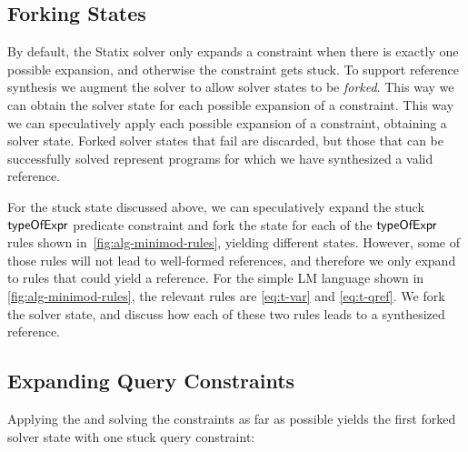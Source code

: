 \subsection{Forking States}
By default, the Statix solver only expands a constraint when there is exactly one possible expansion, and otherwise the constraint gets stuck.
To support reference synthesis we augment the solver to allow solver states to be \emph{forked}.
This way we can obtain the solver state for each possible expansion of a constraint.
This way we can speculatively apply each possible expansion of a constraint, obtaining a solver state.
Forked solver states that fail are discarded, but those that can be successfully solved represent programs for which we have synthesized a valid reference.

For the stuck state discussed above, we can speculatively expand the stuck $\mathsf{typeOfExpr}$ predicate constraint and fork the state for each of the $\mathsf{typeOfExpr}$ rules shown in~\cref{fig:alg-minimod-rules}, yielding different states.
However, some of those rules will not lead to well-formed references, and therefore we only expand to rules that could yield a reference.
For the simple LM language shown in \cref{fig:alg-minimod-rules}, the relevant rules are \ref{eq:t-var} and \ref{eq:t-qref}.
We fork the solver state, and discuss how each of these two rules leads to a synthesized reference.


\subsection{Expanding Query Constraints}
Applying the  and solving the constraints as far as possible yields the first forked solver state with one stuck query constraint:

